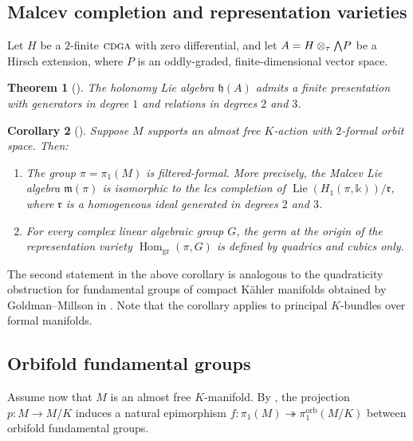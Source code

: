 \documentclass{article}
\numberwithin{equation}{section}
\newtheorem{theorem}{Theorem}[section]
\newtheorem{corollary}[theorem]{Corollary}
\theoremstyle{definition}
\renewcommand{\k}{\mathbb{k}}
\newcommand{\h}{{\mathfrak{h}}}
\newcommand{\m}{{\mathfrak{m}}}
\newcommand{\cdga}{\ensuremath{\textsc{cdga}}}
\DeclareMathOperator{\gr}{gr}
\DeclareMathOperator{\Hom}{{Hom}}
\DeclareMathOperator{\Lie}{Lie}
\DeclareMathOperator{\orb}{orb}
\newcommand{\surj}{\twoheadrightarrow}
\newcommand{\bwedge}{\mbox{\normalsize $\bigwedge$}}
\begin{document}
\subsection{Malcev completion and representation varieties}
\label{subsec:formalbase}

Let $H$ be a $2$-finite $\cdga$ with zero differential, and 
let $A=H\otimes_{\tau} \bwedge P$ be a Hirsch extension, 
where $P$ is an oddly-graded, finite-dimensional vector space.

\begin{theorem}[\cite{PS-imrn19}]
\label{thm:filtf}
The holonomy Lie algebra $\h(A)$ admits a finite presentation
with generators in degree $1$ and relations in degrees $2$ and $3$. 
\end{theorem}

\begin{corollary}[\cite{PS-imrn19}]
\label{cor:ffcircle}
Suppose $M$ supports an almost free $K$-action with $2$-formal orbit space. 
Then:
\begin{enumerate}
\item \label{ff1}
The group $\pi=\pi_1(M)$ is filtered-formal. 
More precisely, the Malcev Lie algebra $\m(\pi)$ is isomorphic 
to the lcs completion of  $\Lie(H_1(\pi, \k))/\mathfrak{r}$, where 
$\mathfrak{r}$ is a homogeneous ideal generated in degrees $2$ and $3$. 

\item \label{ff2}
For every complex linear algebraic group $G$,  
the germ at the origin of the representation variety 
$\Hom_{\gr}(\pi,G)$ is defined by quadrics and cubics only.
\end{enumerate}
\end{corollary}

The second statement in the above corollary is analogous to the 
quadraticity obstruction for fundamental groups of compact K\"ahler 
manifolds obtained by Goldman--Millson in \cite{Goldman-Millson}. %
Note that the corollary applies to principal $K$-bundles over formal manifolds.

\subsection{Orbifold fundamental groups}
\label{subsec:orbifold}
Assume now that $M$ is an almost free $K$-manifold. By \cite[Theorem 4.3.18]{BG}, 
the projection $p\colon M\to M/K$ induces a natural epimorphism 
$f\colon \pi_1 (M) \surj \pi_1^{\orb} (M/K)$ between orbifold fundamental groups.
\end{document}
